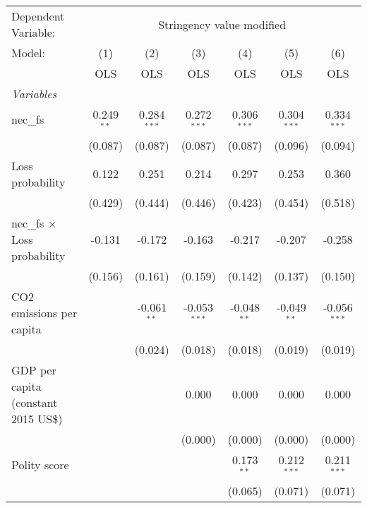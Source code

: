 
\begingroup
\centering
\begin{tabular}{lcccccc}
   \toprule
   Dependent Variable: & \multicolumn{6}{c}{Stringency value modified}\\
   Model:                               & (1)          & (2)           & (3)            & (4)           & (5)           & (6)\\  
                                        &  OLS         & OLS           & OLS            & OLS           & OLS           & OLS\\  
   \midrule
   \emph{Variables}\\
   nec\_fs                              & 0.249$^{**}$ & 0.284$^{***}$ & 0.272$^{***}$  & 0.306$^{***}$ & 0.304$^{***}$ & 0.334$^{***}$\\   
                                        & (0.087)      & (0.087)       & (0.087)        & (0.087)       & (0.096)       & (0.094)\\   
   Loss probability                     & 0.122        & 0.251         & 0.214          & 0.297         & 0.253         & 0.360\\   
                                        & (0.429)      & (0.444)       & (0.446)        & (0.423)       & (0.454)       & (0.518)\\   
   nec\_fs $\times$ Loss probability    & -0.131       & -0.172        & -0.163         & -0.217        & -0.207        & -0.258\\   
                                        & (0.156)      & (0.161)       & (0.159)        & (0.142)       & (0.137)       & (0.150)\\   
   CO2 emissions per capita             &              & -0.061$^{**}$ & -0.053$^{***}$ & -0.048$^{**}$ & -0.049$^{**}$ & -0.056$^{***}$\\   
                                        &              & (0.024)       & (0.018)        & (0.018)       & (0.019)       & (0.019)\\   
   GDP per capita (constant 2015 US\$)  &              &               & 0.000          & 0.000         & 0.000         & 0.000\\   
                                        &              &               & (0.000)        & (0.000)       & (0.000)       & (0.000)\\   
   Polity score                         &              &               &                & 0.173$^{**}$  & 0.212$^{***}$ & 0.211$^{***}$\\   
                                        &              &               &                & (0.065)       & (0.071)       & (0.071)\\   

\end{tabular}
